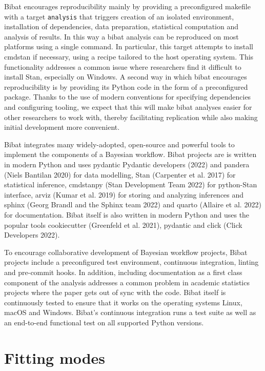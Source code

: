 \documentclass[
  letterpaper,
  DIV=11,
  numbers=noendperiod]{scrartcl}
\begin{document}
Bibat encourages reproducibility mainly by providing a preconfigured
makefile with a target \texttt{analysis} that triggers creation of an
isolated environment, installation of dependencies, data preparation,
statistical computation and analysis of results. In this way a bibat
analysis can be reproduced on most platforms using a single command. In
particular, this target attempts to install cmdstan if necessary, using
a recipe tailored to the host operating system. This functionality
addresses a common issue where researchers find it difficult to install
Stan, especially on Windows. A second way in which bibat encourages
reproducibility is by providing its Python code in the form of a
preconfigured package. Thanks to the use of modern conventions for
specifying dependencies and configuring tooling, we expect that this
will make bibat analyses easier for other researchers to work with,
thereby facilitating replication while also making initial development
more convenient.

Bibat integrates many widely-adopted, open-source and powerful tools to
implement the components of a Bayesian workflow. Bibat projects are is
written in modern Python and uses pydantic Pydantic developers (2022)
and pandera (Niels Bantilan 2020) for data modelling, Stan (Carpenter et
al. 2017) for statistical inference, cmdstanpy (Stan Development Team
2022) for python-Stan interface, arviz (Kumar et al. 2019) for storing
and analyzing inferences and sphinx (Georg Brandl and the Sphinx team
2022) and quarto (Allaire et al. 2022) for documentation. Bibat itself
is also written in modern Python and uses the popular tools cookiecutter
(Greenfeld et al. 2021), pydantic and click (Click Developers 2022).

To encourage collaborative development of Bayesian workflow projects,
Bibat projects include a preconfigured test environment, continuous
integration, linting and pre-commit hooks. In addition, including
documentation as a first class component of the analysis addresses a
common problem in academic statistics projects where the paper gets out
of sync with the code. Bibat itself is continuously tested to ensure
that it works on the operating systems Linux, macOS and Windows. Bibat's
continuous integration runs a test suite as well as an end-to-end
functional test on all supported Python versions.

\section{Fitting modes}\label{fitting-modes}
\end{document}
